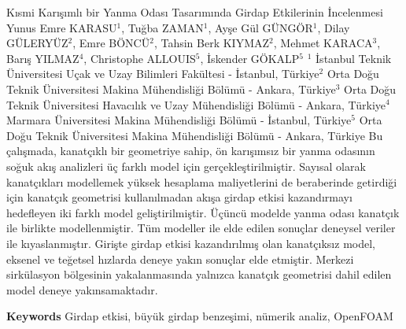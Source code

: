 
    \begin{abstract_online}{Kısmi Karışımlı bir Yanma Odası Tasarımında Girdap Etkilerinin İncelenmesi}{%
        Yunus Emre KARASU$^{1}$, Tuğba ZAMAN$^{1}$, Ayşe Gül GÜNGÖR$^{1}$, Dilay GÜLERYÜZ$^{2}$, Emre BÖNCÜ$^{2}$, Tahsin Berk KIYMAZ$^{2}$, Mehmet KARACA$^{3}$, Barış YILMAZ$^{4}$, Christophe ALLOUIS$^{5}$, İskender GÖKALP$^{5}$}{%
        }{%
        $^1$ İstanbul Teknik Üniversitesi Uçak ve Uzay Bilimleri Fakültesi - İstanbul, Türkiye\newline{}$^2$ Orta Doğu Teknik Üniversitesi Makina Mühendisliği Bölümü - Ankara, Türkiye\newline{}$^3$ Orta Doğu Teknik Üniversitesi Havacılık ve Uzay Mühendisliği Bölümü - Ankara, Türkiye\newline{}$^4$ Marmara Üniversitesi Makina Mühendisliği Bölümü - İstanbul, Türkiye\newline{}$^5$ Orta Doğu Teknik Üniversitesi Makina Mühendisliği Bölümü - Ankara, Türkiye}
    Bu çalışmada, kanatçıklı bir geometriye sahip, ön karışımsız bir yanma odasının soğuk akış analizleri üç farklı model için gerçekleştirilmiştir. Sayısal olarak kanatçıkları modellemek yüksek hesaplama maliyetlerini de beraberinde getirdiği için kanatçık geometrisi kullanılmadan akışa girdap etkisi kazandırmayı hedefleyen iki farklı model geliştirilmiştir. Üçüncü modelde yanma odası kanatçık ile birlikte modellenmiştir. Tüm modeller ile elde edilen sonuçlar deneysel veriler ile kıyaslanmıştır. \newline Girişte girdap etkisi kazandırılmış olan kanatçıksız model, eksenel ve teğetsel hızlarda deneye yakın sonuçlar elde etmiştir. Merkezi sirkülasyon bölgesinin yakalanmasında yalnızca kanatçık geometrisi dahil edilen model deneye yakınsamaktadır. 
    
        \textbf{Keywords} \newline{}Girdap etkisi, büyük girdap benzeşimi, nümerik analiz, OpenFOAM
    \end{abstract_online}
    